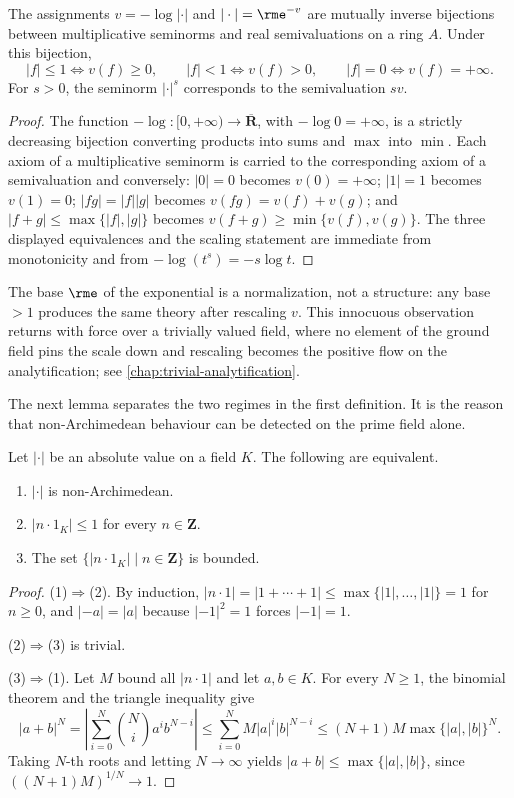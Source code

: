 \begin{lemma}\label{lem:seminorm-semivaluation-dictionary}
The assignments $v=-\log|\cdot|$ and $|\cdot|=\rme^{-v}$ are mutually
inverse bijections between multiplicative seminorms and real semivaluations
on a ring $A$. Under this bijection,
\[
 |f|\leq1\Longleftrightarrow v(f)\geq0,
 \qquad
 |f|<1\Longleftrightarrow v(f)>0,
 \qquad
 |f|=0\Longleftrightarrow v(f)=+\infty.
\]
For $s>0$, the seminorm $|\cdot|^s$ corresponds to the semivaluation $sv$.
\end{lemma}
\begin{proof}
The function $-\log:[0,+\infty)\to\overline{\mathbf R}$, with
$-\log0=+\infty$, is a strictly decreasing bijection converting products
into sums and $\max$ into $\min$. Each axiom of a multiplicative seminorm is
carried to the corresponding axiom of a semivaluation and conversely:
$|0|=0$ becomes $v(0)=+\infty$; $|1|=1$ becomes $v(1)=0$;
$|fg|=|f||g|$ becomes $v(fg)=v(f)+v(g)$; and
$|f+g|\leq\max\{|f|,|g|\}$ becomes $v(f+g)\geq\min\{v(f),v(g)\}$. The three
displayed equivalences and the scaling statement are immediate from
monotonicity and from $-\log(t^s)=-s\log t$.
\end{proof}

The base $\rme$ of the exponential is a normalization, not a structure: any
base $>1$ produces the same theory after rescaling $v$. This innocuous
observation returns with force over a trivially valued field, where no
element of the ground field pins the scale down and rescaling becomes the
positive flow on the analytification; see
\cref{chap:trivial-analytification}.

The next lemma separates the two regimes in the first definition. It is
the reason that non-Archimedean behaviour can be detected on the prime
field alone.

\begin{lemma}\label{lem:ultrametric-integer-bound}
Let $|\cdot|$ be an absolute value on a field $K$. The following are
equivalent.
\begin{enumerate}
\item $|\cdot|$ is non-Archimedean.
\item $|n\cdot1_K|\leq1$ for every $n\in\mathbf Z$.
\item The set $\{|n\cdot1_K|\mid n\in\mathbf Z\}$ is bounded.
\end{enumerate}
\end{lemma}
\begin{proof}
(1)$\Rightarrow$(2). By induction,
$|n\cdot1|=|1+\cdots+1|\leq\max\{|1|,\ldots,|1|\}=1$ for $n\geq0$, and
$|-a|=|a|$ because $|-1|^2=1$ forces $|-1|=1$.

(2)$\Rightarrow$(3) is trivial.

(3)$\Rightarrow$(1). Let $M$ bound all $|n\cdot1|$ and let $a,b\in K$. For
every $N\geq1$, the binomial theorem and the triangle inequality give
\[
 |a+b|^N=\left|\sum_{i=0}^N\binom{N}{i}a^ib^{N-i}\right|
 \leq\sum_{i=0}^{N}M|a|^i|b|^{N-i}
 \leq (N+1)M\max\{|a|,|b|\}^N.
\]
Taking $N$-th roots and letting $N\to\infty$ yields
$|a+b|\leq\max\{|a|,|b|\}$, since $((N+1)M)^{1/N}\to1$.
\end{proof}


